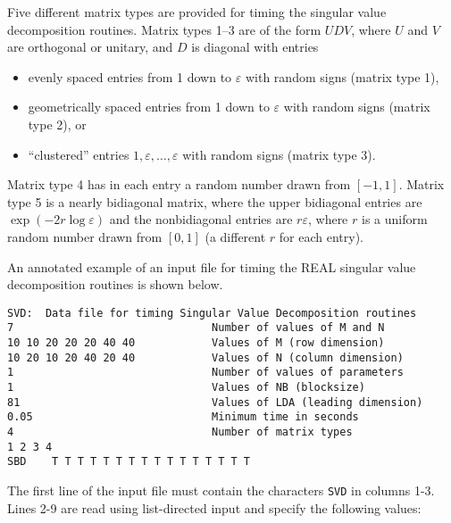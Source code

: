 Five different matrix types are provided for timing the singular
value decomposition routines.  
Matrix types 1--3 are of the form $UDV$,
where $U$ and $V$ are orthogonal or unitary, and $D$ is diagonal
with entries
\begin{itemize}
\item evenly spaced entries from 1 down to $\varepsilon$ with random signs
(matrix type 1),
\item geometrically  spaced entries from 1 down to $\varepsilon$ with random 
signs (matrix type 2), or
\item ``clustered'' entries $1, \varepsilon , \ldots, \varepsilon$  with random
signs (matrix type 3).
\end{itemize}
Matrix type 4 has in each entry a random number drawn from $[-1,1]$. 
Matrix type 5 is a nearly bidiagonal matrix, where the
upper bidiagonal entries are $\exp (-2 r \log \varepsilon )$
and the nonbidiagonal entries are $r \varepsilon$, where $r$
is a uniform random number drawn from $[0,1]$ (a different $r$ for each entry).

An annotated example of an input file for timing the
REAL singular value decomposition routines is shown below.

\begin{verbatim}
SVD:  Data file for timing Singular Value Decomposition routines
7                               Number of values of M and N
10 10 20 20 20 40 40            Values of M (row dimension)
10 20 10 20 40 20 40            Values of N (column dimension)
1                               Number of values of parameters
1                               Values of NB (blocksize)
81                              Values of LDA (leading dimension)
0.05                            Minimum time in seconds
4                               Number of matrix types
1 2 3 4
SBD    T T T T T T T T T T T T T T T T 
\end{verbatim}
The first line of the input file 
must contain the characters {\tt SVD} in columns 1-3.
Lines 2-9 are read using list-directed input and specify the following
values:



